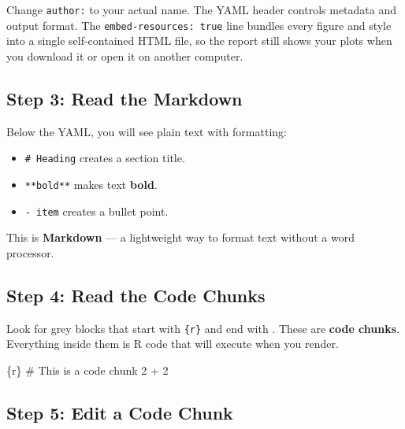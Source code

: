 \documentclass[
  letterpaper,
  DIV=11,
  numbers=noendperiod,
  oneside]{scrreprt}
\newenvironment{Shaded}{\begin{snugshade}}{\end{snugshade}}
\newcommand{\CommentTok}[1]{\textcolor[rgb]{0.37,0.37,0.37}{#1}}
\newcommand{\DecValTok}[1]{\textcolor[rgb]{0.68,0.00,0.00}{#1}}
\newcommand{\InformationTok}[1]{\textcolor[rgb]{0.37,0.37,0.37}{#1}}
\newcommand{\SpecialCharTok}[1]{\textcolor[rgb]{0.37,0.37,0.37}{#1}}
\providecommand{\tightlist}{%
  \setlength{\itemsep}{0pt}\setlength{\parskip}{0pt}}
\begin{document}
Change \texttt{author:} to your actual name. The YAML header controls
metadata and output format. The \texttt{embed-resources:\ true} line
bundles every figure and style into a single self-contained HTML file,
so the report still shows your plots when you download it or open it on
another computer.

\subsection*{Step 3: Read the Markdown}\label{step-3-read-the-markdown}

Below the YAML, you will see plain text with formatting:

\begin{itemize}
\tightlist
\item
  \texttt{\#\ Heading} creates a section title.
\item
  \texttt{**bold**} makes text \textbf{bold}.
\item
  \texttt{-\ item} creates a bullet point.
\end{itemize}

This is \textbf{Markdown} --- a lightweight way to format text without a
word processor.

\subsection*{Step 4: Read the Code
Chunks}\label{step-4-read-the-code-chunks}

Look for grey blocks that start with
\texttt{\textasciigrave{}\textasciigrave{}\textasciigrave{}\{r\}} and
end with \texttt{\textasciigrave{}\textasciigrave{}\textasciigrave{}}.
These are \textbf{code chunks}. Everything inside them is R code that
will execute when you render.

\begin{Shaded}
\begin{Highlighting}[numbers=left,,]
\InformationTok{\textasciigrave{}\textasciigrave{}\textasciigrave{}\{r\}}
\CommentTok{\# This is a code chunk}
\DecValTok{2} \SpecialCharTok{+} \DecValTok{2}
\InformationTok{\textasciigrave{}\textasciigrave{}\textasciigrave{}}
\end{Highlighting}
\end{Shaded}

\subsection*{Step 5: Edit a Code Chunk}\label{step-5-edit-a-code-chunk}
\end{document}
